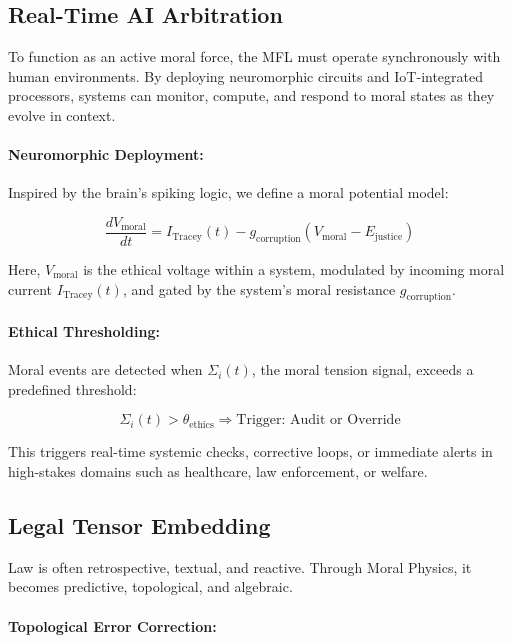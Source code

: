 \documentclass{article}
\theoremstyle{plain}
\theoremstyle{claimstyle}
\begin{document}
\subsection{Real-Time AI Arbitration}

To function as an active moral force, the MFL must operate synchronously with human environments. By deploying neuromorphic circuits and IoT-integrated processors, systems can monitor, compute, and respond to moral states as they evolve in context.

\paragraph{Neuromorphic Deployment:}

Inspired by the brain’s spiking logic, we define a moral potential model:

\[
\frac{dV_{\text{moral}}}{dt} = I_{\text{Tracey}}(t) - g_{\text{corruption}}(V_{\text{moral}} - E_{\text{justice}})
\]

Here, \(V_{\text{moral}}\) is the ethical voltage within a system, modulated by incoming moral current \(I_{\text{Tracey}}(t)\), and gated by the system's moral resistance \(g_{\text{corruption}}\).

\paragraph{Ethical Thresholding:}

Moral events are detected when \(\Sigma_i(t)\), the moral tension signal, exceeds a predefined threshold:

\[
\Sigma_i(t) > \theta_{\text{ethics}} \Rightarrow \text{Trigger: Audit or Override}
\]

This triggers real-time systemic checks, corrective loops, or immediate alerts in high-stakes domains such as healthcare, law enforcement, or welfare.

\subsection{Legal Tensor Embedding}

Law is often retrospective, textual, and reactive. Through Moral Physics, it becomes predictive, topological, and algebraic.

\paragraph{Topological Error Correction:}
\end{document}
